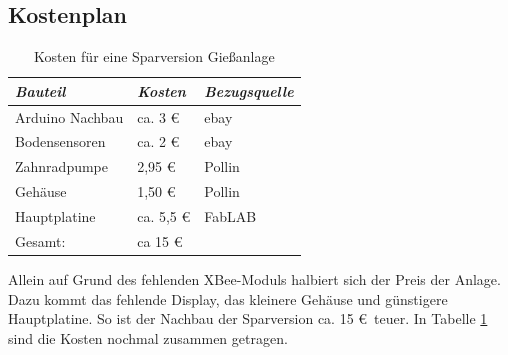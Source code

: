 	
	
	\subsection{Kostenplan}

	\begin{table}[!h]
		\centering
		\onehalfspacing
		\footnotesize
		\caption{Kosten für eine  Sparversion Gießanlage}
		\label{Kosten für eine Sparversion Giesanlage}
	\begin{tabular}{|l|ll|}
			\hline
		\textit{Bauteil} & \textit{Kosten} & \textit{Bezugsquelle} \\
		\hline
		Arduino Nachbau & ca. 3 \euro & ebay \\
		Bodensensoren & ca. 2 \euro & ebay \\
		Zahnradpumpe & 2,95 \euro & Pollin \\
		Gehäuse	& 1,50 \euro & Pollin \\
		Hauptplatine & ca. 5,5 \euro & FabLAB \\
		\hline
		Gesamt: & ca 15 \euro & \\
		\hline
	\end{tabular}
	\end{table}
	
	  	
	Allein auf Grund des fehlenden XBee-Moduls halbiert sich der Preis der Anlage.
	Dazu kommt das fehlende Display, das kleinere Gehäuse und günstigere Hauptplatine.
	So ist der Nachbau der Sparversion ca. 15 \euro\ teuer. 
	In Tabelle \ref{Kosten für eine Sparversion Giesanlage} sind die Kosten nochmal zusammen getragen.
	 

	
